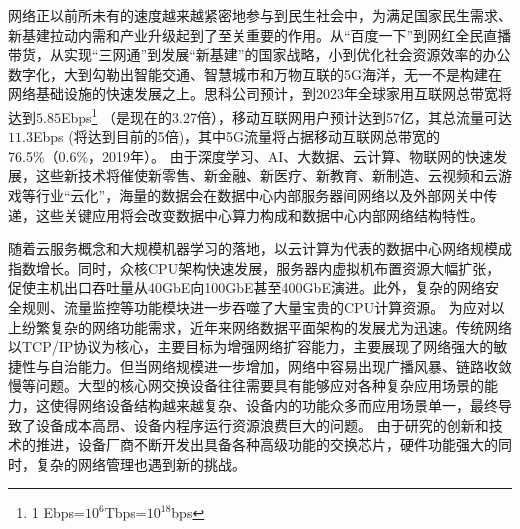 
\label{chap1}


\label{chap11}
\label{chap111}


网络正以前所未有的速度越来越紧密地参与到民生社会中，为满足国家民生需求、新基建拉动内需和产业升级起到了至关重要的作用。从“百度一下”到网红全民直播带货，从实现“三网通”到发展“新基建”的国家战略，小到优化社会资源效率的办公数字化，大到勾勒出智能交通、智慧城市和万物互联的5G海洋，无一不是构建在网络基础设施的快速发展之上。思科公司预计，到2023年全球家用互联网总带宽将达到$5.85$Ebps\footnote{1 Ebps=$10^6$Tbps=$10^{18}$bps} （是现在的3.27倍），移动互联网用户预计达到57亿，其总流量可达$11.3$Ebps (将达到目前的5倍)，其中5G流量将占据移动互联网总带宽的76.5\%（0.6\%，2019年）。
由于深度学习、AI、大数据、云计算、物联网的快速发展，这些新技术将催使新零售、新金融、新医疗、新教育、新制造、云视频和云游戏等行业“云化”，海量的数据会在数据中心内部服务器间网络以及外部网关中传递，这些关键应用将会改变数据中心算力构成和数据中心内部网络结构特性。

随着云服务概念和大规模机器学习的落地，以云计算为代表的数据中心网络规模成指数增长。同时，众核CPU架构快速发展，服务器内虚拟机布置资源大幅扩张，促使主机出口吞吐量从40GbE向100GbE甚至400GbE演进。此外，复杂的网络安全规则、流量监控等功能模块进一步吞噬了大量宝贵的CPU计算资源。
为应对以上纷繁复杂的网络功能需求，近年来网络数据平面架构的发展尤为迅速。传统网络以TCP/IP协议为核心，主要目标为增强网络扩容能力，主要展现了网络强大的敏捷性与自治能力。但当网络规模进一步增加，网络中容易出现广播风暴、链路收敛慢等问题。大型的核心网交换设备往往需要具有能够应对各种复杂应用场景的能力，这使得网络设备结构越来越复杂、设备内的功能众多而应用场景单一，最终导致了设备成本高昂、设备内程序运行资源浪费巨大的问题。
由于研究的创新和技术的推进，设备厂商不断开发出具备各种高级功能的交换芯片，硬件功能强大的同时，复杂的网络管理也遇到新的挑战。

